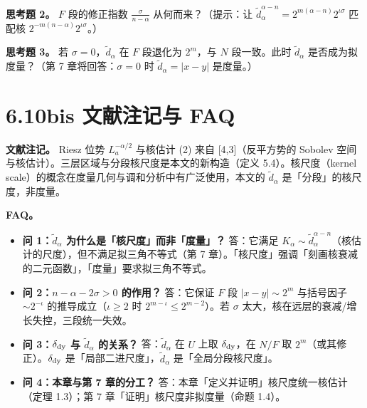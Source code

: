 \documentclass[a4paper,11pt,openany]{ctexbook}
\numberwithin{equation}{chapter}
\numberwithin{figure}{chapter}
\numberwithin{table}{chapter}
\begin{document}
\textbf{思考题 2。} $F$ 段的修正指数 $\frac{\sigma}{n-\alpha}$ 从何而来？（提示：让 $\widetilde d_\alpha^{\alpha-n}=2^{m(\alpha-n)}2^{\iota\sigma}$ 匹配核 $2^{-m(n-\alpha)}2^{\iota\sigma}$。）

\textbf{思考题 3。} 若 $\sigma=0$，$\widetilde d_\alpha$ 在 $F$ 段退化为 $2^m$，与 $N$ 段一致。此时 $\widetilde d_\alpha$ 是否成为拟度量？（第 7 章将回答：$\sigma=0$ 时 $\widetilde d_\alpha=|x-y|$ 是度量。）

\section{6.10bis 文献注记与 FAQ}

\textbf{文献注记。} Riesz 位势 $L_a^{-\alpha/2}$ 与核估计 (2) 来自 [4,3]（反平方势的 Sobolev 空间与核估计）。三层区域与分段核尺度是本文的新构造（定义 5.4）。核尺度（kernel scale）的概念在度量几何与调和分析中有广泛使用，本文的 $\widetilde d_\alpha$ 是「分段」的核尺度，非度量。

\textbf{FAQ。}

\begin{itemize}
\item \textbf{问 1：$\widetilde d_\alpha$ 为什么是「核尺度」而非「度量」？} 答：它满足 $K_\alpha\sim\widetilde d_\alpha^{\alpha-n}$（核估计的尺度），但不满足拟三角不等式（第 7 章）。「核尺度」强调「刻画核衰减的二元函数」，「度量」要求拟三角不等式。
\end{itemize}

\begin{itemize}
\item \textbf{问 2：$n-\alpha-2\sigma>0$ 的作用？} 答：它保证 $F$ 段 $|x-y|\sim2^m$ 与括号因子 $\sim2^{-\iota}$ 的推导成立（$\iota\ge2$ 时 $2^{m-\iota}\le2^{m-2}$）。若 $\sigma$ 太大，核在远层的衰减/增长失控，三段统一失效。
\end{itemize}

\begin{itemize}
\item \textbf{问 3：$\delta_{\rm dy}$ 与 $\widetilde d_\alpha$ 的关系？} 答：$\widetilde d_\alpha$ 在 $U$ 上取 $\delta_{\rm dy}$，在 $N/F$ 取 $2^m$（或其修正）。$\delta_{\rm dy}$ 是「局部二进尺度」，$\widetilde d_\alpha$ 是「全局分段核尺度」。
\end{itemize}

\begin{itemize}
\item \textbf{问 4：本章与第 7 章的分工？} 答：本章「定义并证明」核尺度统一核估计（定理 1.3）；第 7 章「证明」核尺度非拟度量（命题 1.4）。
\end{itemize}
\end{document}

